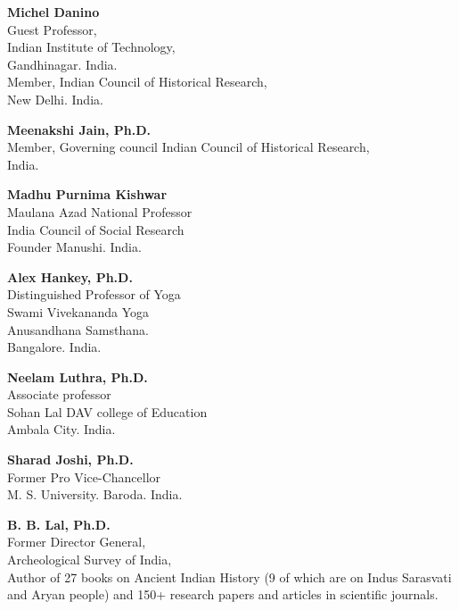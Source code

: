\begin{multicols}{2}
\begin{trivlist}
\itemsep=10pt
\item \textbf{Michel Danino}\\ 
Guest Professor,\\ 
Indian Institute of Technology,\\ 
Gandhinagar. India.\\
Member, Indian Council of Historical Research,\\ 
New Delhi. India.

\item \textbf{Meenakshi Jain, Ph.D.}\\ 
Member, Governing council Indian Council of Historical Research,\\
India.
 

\item \textbf{Madhu Purnima Kishwar}\\ 
Maulana Azad National Professor\\
India Council of Social Research\\
Founder Manushi. India.
 
\item \textbf{Alex Hankey, Ph.D.}\\ 
Distinguished Professor of Yoga\\
Swami Vivekananda Yoga\\ Anusandhana Samsthana.\\ 
Bangalore. India.
 
\item \textbf{Neelam Luthra, Ph.D.}\\ 
Associate professor\\
Sohan Lal DAV college of Education\\
Ambala City. India.
 
\item \textbf{Sharad Joshi, Ph.D.}\\ 
Former Pro Vice-Chancellor\\
M. S. University. Baroda. India.

\item \textbf{B. B. Lal, Ph.D.}\\ 
Former Director General,\\ 
Archeological Survey of India,\\
Author of 27 books on Ancient Indian History (9 of which are on Indus Sarasvati and Aryan people) and 150+ research papers and articles in scientific journals. 
 

\end{trivlist}
\end{multicols}
